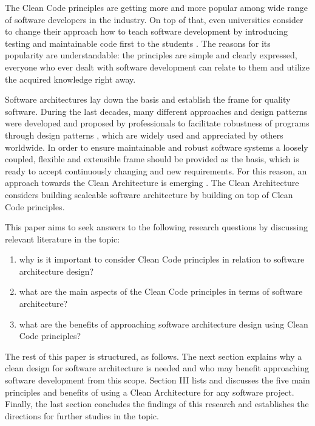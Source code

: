 \documentclass[conference]{IEEEtran}
\begin{document}
The Clean Code principles are getting more and more popular among wide range of software developers in the industry. On top of that, even universities consider to change their approach how to teach software development by introducing testing and maintainable code first to the students \cite{studentscleancode}. The reasons for its popularity are understandable: the principles are simple and clearly expressed, everyone who ever dealt with software development can relate to them and utilize the acquired knowledge right away. 

Software architectures lay down the basis and establish the frame for quality software. During the last decades, many different approaches and design patterns were developed and proposed by professionals to facilitate robustness of programs through design patterns \cite{codecomplete} \cite{onionarchitecture} \cite{gof}, which are widely used and appreciated by others worldwide. In order to ensure maintainable and robust software systems a loosely coupled, flexible and extensible frame should be provided as the basis, which is ready to accept continuously changing and new requirements. For this reason, an approach towards the Clean Architecture is emerging \cite{cleanarchitecture}. The Clean Architecture considers building scaleable software architecture by building on top of Clean Code principles. 

This paper aims to seek answers to the following research questions by discussing relevant literature in the topic: 

\setdefaultleftmargin{40pt}{}{}{}{}{}
\begin{enumerate}[label=RQ\arabic*:]
	\item why is it important to consider Clean Code principles in relation to software architecture design?
	\item what are the main aspects of the Clean Code principles in terms of software architecture?
	\item what are the benefits of approaching software architecture design using Clean Code principles?
\end{enumerate}  

The rest of this paper is structured, as follows. The next section explains why a clean design for software architecture is needed and who may benefit approaching software development from this scope. Section III lists and discusses the five main principles and benefits of using a Clean Architecture for any software project. Finally, the last section concludes the findings of this research and establishes the directions for further studies in the topic. 
\end{document}
